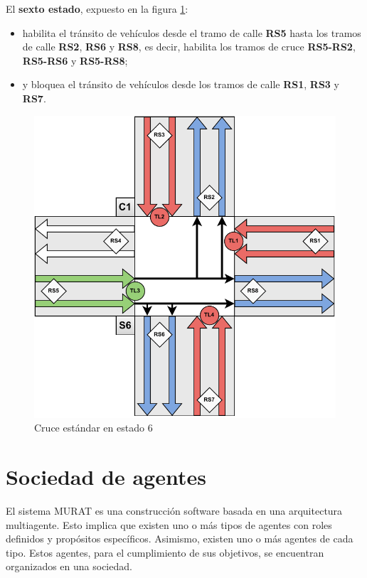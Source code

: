\newpage
El \textbf{sexto estado}, expuesto en la figura \ref{fig:cruce_estandar_estado_6}:
\begin{itemize}
    \item habilita el tránsito de vehículos desde el tramo de calle \textbf{RS5} hasta los tramos de calle \textbf{RS2}, \textbf{RS6} y \textbf{RS8}, es decir, habilita los tramos de cruce \textbf{RS5-RS2}, \textbf{RS5-RS6} y \textbf{RS5-RS8};
    \item y bloquea el tránsito de vehículos desde los tramos de calle \textbf{RS1}, \textbf{RS3} y \textbf{RS7}.
\end{itemize}
\begin{figure}[H]
    \centering
    \includegraphics[width=1\linewidth]{text/image/DCruc-CE-Estado6.pdf}
    \caption{Cruce estándar en estado 6}
    \label{fig:cruce_estandar_estado_6}
\end{figure}

\newpage
\section{Sociedad de agentes}
El sistema MURAT es una construcción software basada en una arquitectura multiagente. Esto implica que existen uno o más tipos de agentes con roles definidos y propósitos específicos. Asimismo, existen uno o más agentes de cada tipo. Estos agentes, para el cumplimiento de sus objetivos, se encuentran organizados en una sociedad.

